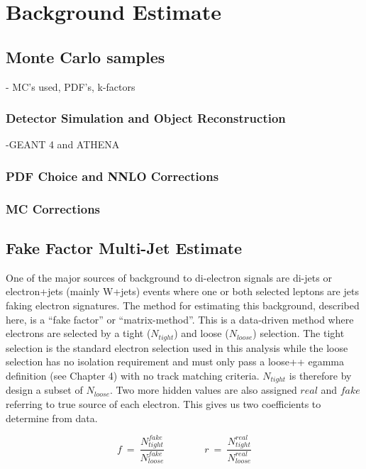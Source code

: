 \chapter{Background Estimate}

\section{Monte Carlo samples}
{\normalsize - MC's used, PDF's, k-factors}


\subsection{Detector Simulation and Object Reconstruction}
   -GEANT 4 and ATHENA

\subsection{PDF Choice and NNLO Corrections}

\subsection{MC Corrections}





\newpage
\section{Fake Factor Multi-Jet Estimate}

One of the major sources of background to di-electron signals are di-jets or electron+jets (mainly W+jets) events where one or both selected leptons are jets faking electron signatures. The method for estimating this background, described here, is a ``fake factor'' or ``matrix-method''. This is a data-driven method where electrons are selected by a tight ($N_{tight}$) and loose ($N_{loose}$) selection. The tight selection is the standard electron selection used in this analysis while the loose selection has no isolation requirement and must only pass a loose++ egamma definition (see Chapter 4) with no track matching criteria. $N_{tight}$ is therefore by design a subset of $N_{loose}$. Two more hidden values are also assigned $real$ and $fake$ referring to true source of each electron. This gives us two coefficients to determine from data.

\begin{equation} \label{eq:fakeRate}
   f~=~\frac{N^{fake}_{tight}}{N^{fake}_{loose}} \qquad \qquad r~=~\frac{N^{real}_{tight}}{N^{real}_{loose}}
\end{equation}

